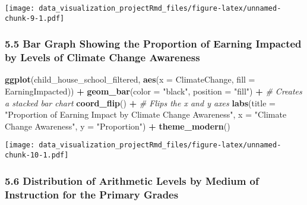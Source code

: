 \documentclass[
]{article}
\newenvironment{Shaded}{\begin{snugshade}}{\end{snugshade}}
\newcommand{\AttributeTok}[1]{\textcolor[rgb]{0.13,0.29,0.53}{#1}}
\newcommand{\CommentTok}[1]{\textcolor[rgb]{0.56,0.35,0.01}{\textit{#1}}}
\newcommand{\FunctionTok}[1]{\textcolor[rgb]{0.13,0.29,0.53}{\textbf{#1}}}
\newcommand{\NormalTok}[1]{#1}
\newcommand{\SpecialCharTok}[1]{\textcolor[rgb]{0.81,0.36,0.00}{\textbf{#1}}}
\newcommand{\StringTok}[1]{\textcolor[rgb]{0.31,0.60,0.02}{#1}}
\begin{document}
\texttt{[image: data\_visualization\_projectRmd\_files/figure-latex/unnamed-chunk-9-1.pdf]}

\subsubsection{5.5 Bar Graph Showing the Proportion of Earning Impacted
by Levels of Climate Change
Awareness}\label{bar-graph-showing-the-proportion-of-earning-impacted-by-levels-of-climate-change-awareness}

\begin{Shaded}
\begin{Highlighting}[]
\FunctionTok{ggplot}\NormalTok{(child\_house\_school\_filtered, }\FunctionTok{aes}\NormalTok{(}\AttributeTok{x =}\NormalTok{ ClimateChange, }\AttributeTok{fill =}\NormalTok{ EarningImpacted)) }\SpecialCharTok{+}
  \FunctionTok{geom\_bar}\NormalTok{(}\AttributeTok{color =} \StringTok{"black"}\NormalTok{, }\AttributeTok{position =} \StringTok{"fill"}\NormalTok{) }\SpecialCharTok{+}  \CommentTok{\# Creates a stacked bar chart}
  \FunctionTok{coord\_flip}\NormalTok{() }\SpecialCharTok{+}  \CommentTok{\# Flips the x and y axes}
  \FunctionTok{labs}\NormalTok{(}\AttributeTok{title =} \StringTok{"Proportion of Earning Impact by Climate Change Awareness"}\NormalTok{, }\AttributeTok{x =} \StringTok{"Climate Change Awareness"}\NormalTok{, }\AttributeTok{y =} \StringTok{"Proportion"}\NormalTok{) }\SpecialCharTok{+}
  \FunctionTok{theme\_modern}\NormalTok{()}
\end{Highlighting}
\end{Shaded}

\texttt{[image: data\_visualization\_projectRmd\_files/figure-latex/unnamed-chunk-10-1.pdf]}

\subsubsection{5.6 Distribution of Arithmetic Levels by Medium of
Instruction for the Primary
Grades}\label{distribution-of-arithmetic-levels-by-medium-of-instruction-for-the-primary-grades}
\end{document}
